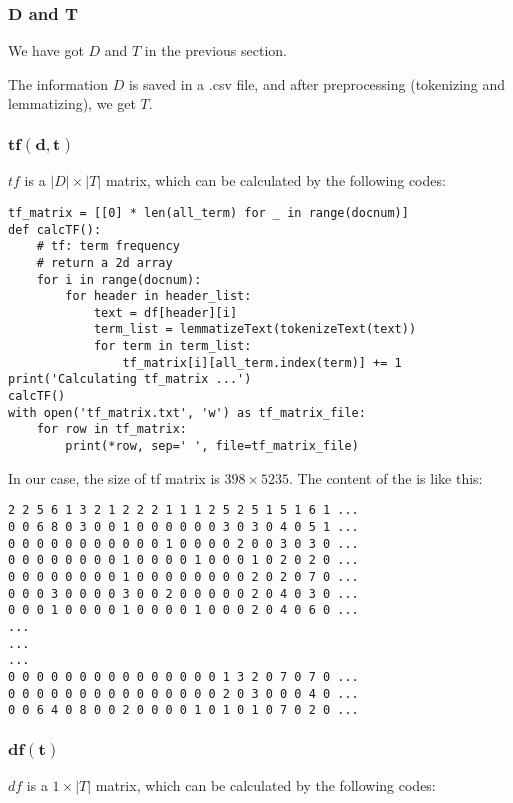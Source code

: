 \documentclass[a4paper, 12pt]{article}
\begin{document}
\subsubsection{$\bm{D}$ and $\bm{T}$}
We have got $D$ and $T$  in the previous section.

The information $D$ is saved in a .csv file, and after preprocessing (tokenizing and lemmatizing), we get $T$.

\subsubsection{$\bm{tf(d,t)}$}
$tf$ is a $|D|\times |T|$ matrix, which can be calculated by the following codes:

\begin{lstlisting}[style=myPython,caption={Calculate tf matrix}]
tf_matrix = [[0] * len(all_term) for _ in range(docnum)]
def calcTF():
    # tf: term frequency
    # return a 2d array
    for i in range(docnum):
        for header in header_list:
            text = df[header][i]
            term_list = lemmatizeText(tokenizeText(text))
            for term in term_list:
                tf_matrix[i][all_term.index(term)] += 1
print('Calculating tf_matrix ...')
calcTF()
with open('tf_matrix.txt', 'w') as tf_matrix_file:
    for row in tf_matrix:
        print(*row, sep=' ', file=tf_matrix_file)
\end{lstlisting}

In our case, the size of tf matrix is $398 \times 5235$. The content of the  is like this:

\begin{lstlisting}[style=plainText,caption={tf\_matrix.txt}]
2 2 5 6 1 3 2 1 2 2 2 1 1 1 2 5 2 5 1 5 1 6 1 ...
0 0 6 8 0 3 0 0 1 0 0 0 0 0 0 3 0 3 0 4 0 5 1 ...
0 0 0 0 0 0 0 0 0 0 0 1 0 0 0 0 2 0 0 3 0 3 0 ...
0 0 0 0 0 0 0 0 1 0 0 0 0 1 0 0 0 1 0 2 0 2 0 ...
0 0 0 0 0 0 0 0 1 0 0 0 0 0 0 0 0 2 0 2 0 7 0 ...
0 0 0 3 0 0 0 0 3 0 0 2 0 0 0 0 0 2 0 4 0 3 0 ...
0 0 0 1 0 0 0 0 1 0 0 0 0 1 0 0 0 2 0 4 0 6 0 ...
...
...
...
0 0 0 0 0 0 0 0 0 0 0 0 0 0 0 1 3 2 0 7 0 7 0 ...
0 0 0 0 0 0 0 0 0 0 0 0 0 0 0 2 0 3 0 0 0 4 0 ...
0 0 6 4 0 8 0 0 2 0 0 0 0 1 0 1 0 1 0 7 0 2 0 ...
\end{lstlisting}


\subsubsection{$\bm{df(t)}$}
$df$ is a $1 \times |T|$ matrix, which can be calculated by the following codes:
\end{document}

